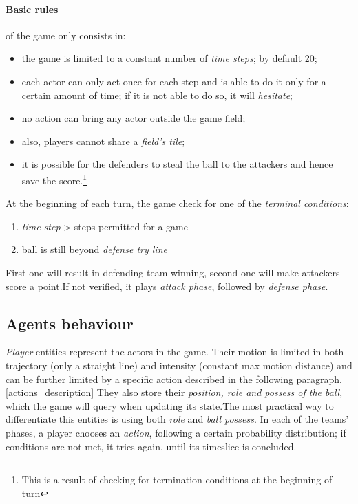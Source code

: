 \documentclass{article}
\begin{document}
\paragraph{Basic rules} of the game only consists in:
\begin{itemize}
    \item the game is limited to a constant number of \emph{time steps}; by default 20;
    \item each actor can only act once for each step and is able to do it only for a certain amount of time; if it is not able to do so, it will \emph{hesitate};
    \item no action can bring any actor outside the game field;
    \item also, players cannot share a \emph{field's tile};
    \item it is possible for the defenders to steal the ball to the attackers and hence save the score.\footnote{This is a result of checking for termination conditions at the beginning of turn}
\end{itemize}

At the beginning of each turn, the game check for one of the \emph{terminal conditions}:
\begin{enumerate}
    \item \emph{time step} > steps permitted for a game
    \item ball is still beyond \emph{defense try line}
\end{enumerate}
First one will result in defending team winning, second one will make attackers score a point.\newline If not verified, it plays \emph{attack phase}, followed by \emph{defense phase}.

\subsection{Agents behaviour}
\emph{Player} entities represent the actors in the game. Their motion is limited in both trajectory (only a straight line) and intensity (constant max motion distance) and can be further limited by a specific action described in the following paragraph.\ref{actions_description}
They also store their \emph{position, role and possess of the ball}, which the game will query when updating its state.\newline The most practical way to differentiate this entities is using both \emph{role} and \emph{ball possess}.\newline
In each of the teams' phases, a player chooses an \emph{action}, following a certain probability distribution; if conditions are not met, it tries again, until its timeslice is concluded.
\end{document}
